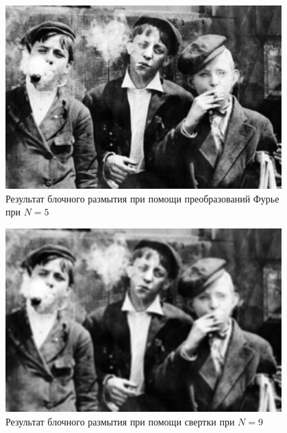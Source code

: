 \begin{figure}[ht!]
    \centering
    \includegraphics[width=0.95\textwidth]{images/result/task_2/Averaging_fourier_5.png}
    \caption{Результат блочного размытия при помощи преобразований Фурье при $N=5$}
    \label{fig:av_f_5}
\end{figure}

\begin{figure}[ht!]
    \centering
    \includegraphics[width=0.95\textwidth]{images/result/task_2/Averaging_9.png}
    \caption{Результат блочного размытия при помощи свертки при $N=9$}
    \label{fig:av_c_9}
\end{figure}


